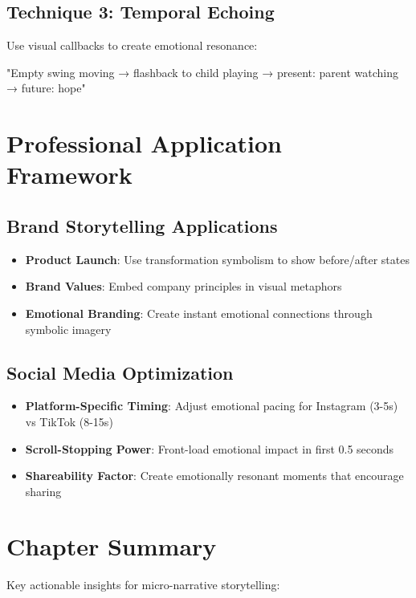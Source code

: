 \subsection*{Technique 3: Temporal Echoing}
Use visual callbacks to create emotional resonance:
\begin{Prompt}
"Empty swing moving → flashback to child playing → present: parent watching → future: hope"
\end{Prompt}

\section*{Professional Application Framework}

\subsection*{Brand Storytelling Applications}
\begin{itemize}
\item \textbf{Product Launch}: Use transformation symbolism to show before/after states
\item \textbf{Brand Values}: Embed company principles in visual metaphors
\item \textbf{Emotional Branding}: Create instant emotional connections through symbolic imagery
\end{itemize}

\subsection*{Social Media Optimization}
\begin{itemize}
\item \textbf{Platform-Specific Timing}: Adjust emotional pacing for Instagram (3-5s) vs TikTok (8-15s)
\item \textbf{Scroll-Stopping Power}: Front-load emotional impact in first 0.5 seconds
\item \textbf{Shareability Factor}: Create emotionally resonant moments that encourage sharing
\end{itemize}

\section*{Chapter Summary}

Key actionable insights for micro-narrative storytelling:

